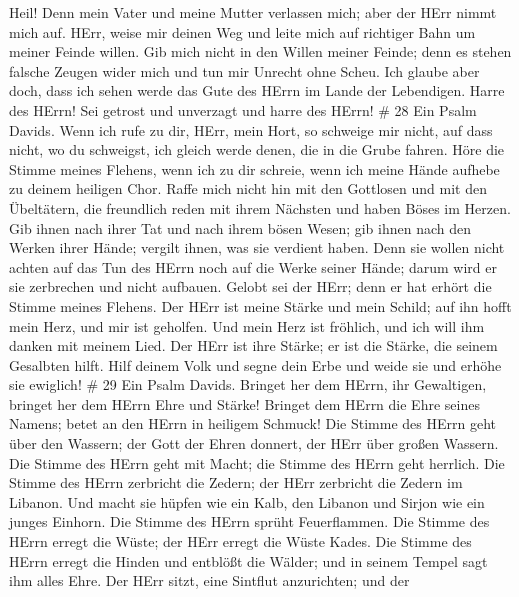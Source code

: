 Heil!  Denn mein Vater und meine Mutter verlassen mich;
aber der HErr nimmt mich auf.  HErr, weise mir deinen Weg
und leite mich auf richtiger Bahn um meiner Feinde willen. 
Gib mich nicht in den Willen meiner Feinde; denn es stehen falsche
Zeugen wider mich und tun mir Unrecht ohne Scheu.  Ich
glaube aber doch, dass ich sehen werde das Gute des HErrn im Lande der
Lebendigen.  Harre des HErrn! Sei getrost und unverzagt und
harre des HErrn! \# 28  Ein Psalm Davids. Wenn ich rufe zu
dir, HErr, mein Hort, so schweige mir nicht, auf dass nicht, wo du
schweigst, ich gleich werde denen, die in die Grube fahren. 
Höre die Stimme meines Flehens, wenn ich zu dir schreie, wenn ich meine
Hände aufhebe zu deinem heiligen Chor.  Raffe mich nicht hin
mit den Gottlosen und mit den Übeltätern, die freundlich reden mit ihrem
Nächsten und haben Böses im Herzen.  Gib ihnen nach ihrer
Tat und nach ihrem bösen Wesen; gib ihnen nach den Werken ihrer Hände;
vergilt ihnen, was sie verdient haben.  Denn sie wollen
nicht achten auf das Tun des HErrn noch auf die Werke seiner Hände;
darum wird er sie zerbrechen und nicht aufbauen.  Gelobt sei
der HErr; denn er hat erhört die Stimme meines Flehens.  Der
HErr ist meine Stärke und mein Schild; auf ihn hofft mein Herz, und mir
ist geholfen. Und mein Herz ist fröhlich, und ich will ihm danken mit
meinem Lied.  Der HErr ist ihre Stärke; er ist die Stärke,
die seinem Gesalbten hilft.  Hilf deinem Volk und segne dein
Erbe und weide sie und erhöhe sie ewiglich! \# 29  Ein Psalm
Davids. Bringet her dem HErrn, ihr Gewaltigen, bringet her dem HErrn
Ehre und Stärke!  Bringet dem HErrn die Ehre seines Namens;
betet an den HErrn in heiligem Schmuck!  Die Stimme des
HErrn geht über den Wassern; der Gott der Ehren donnert, der HErr über
großen Wassern.  Die Stimme des HErrn geht mit Macht; die
Stimme des HErrn geht herrlich.  Die Stimme des HErrn
zerbricht die Zedern; der HErr zerbricht die Zedern im Libanon.
 Und macht sie hüpfen wie ein Kalb, den Libanon und Sirjon
wie ein junges Einhorn.  Die Stimme des HErrn sprüht
Feuerflammen.  Die Stimme des HErrn erregt die Wüste; der
HErr erregt die Wüste Kades.  Die Stimme des HErrn erregt
die Hinden und entblößt die Wälder; und in seinem Tempel sagt ihm alles
Ehre.  Der HErr sitzt, eine Sintflut anzurichten; und der
